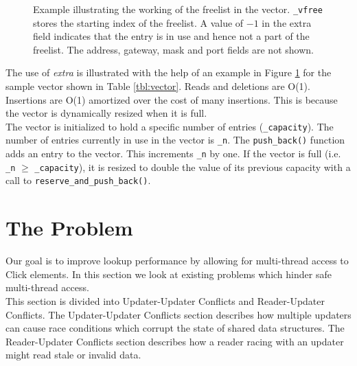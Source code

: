 \documentclass[a4paper]{article}
\begin{document}
\begin{figure}[tph]
\begin{center}
\begin{tabular}{|p{2.5in} c|}
\hline
\end{tabular}
\cprotect\caption{Example illustrating the working of the freelist in the vector. \verb+_vfree+ stores the starting index of the freelist. A value of $-1$ in the extra field indicates that the entry is in use and hence not a part of the freelist. The address, gateway, mask and port fields are not shown.}
\label{fig:freelisteg}
\end{center}
\end{figure}


The use of \emph{extra} is illustrated with the help of an example in Figure \ref{fig:freelisteg} for the sample vector shown in Table \ref{tbl:vector}. Reads and deletions are O(1). Insertions are O(1) amortized over the cost of many insertions. This is because the vector is dynamically resized when it is full.\\

The vector is initialized to hold a specific number of entries (\verb+_capacity+). The number of entries currently in use in the vector is \verb+_n+. The \verb+push_back()+ function adds an entry to the vector. This increments \verb$_n$ by one. If the vector is full (i.e. \verb+_n+ $\ge$ \verb+_capacity+), it is resized to double the value of its previous capacity with a call to \verb+reserve_and_push_back()+.

\section{The Problem}
\label{sec:problem}
Our goal is to improve lookup performance by allowing for multi-thread
access to Click elements. In this section we look at existing problems
which hinder safe multi-thread access.\\

This section is divided into Updater-Updater Conflicts and
Reader-Updater Conflicts. The Updater-Updater Conflicts section
describes how multiple updaters can cause race conditions which
corrupt the state of shared data structures. The Reader-Updater
Conflicts section describes how a reader racing with an updater might
read stale or invalid data.
\end{document}

